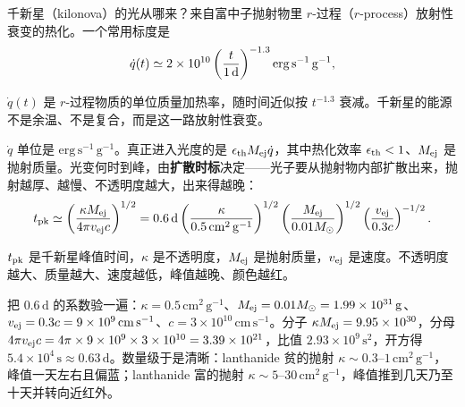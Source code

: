 千新星（kilonova）的光从哪来？来自富中子抛射物里 \(r\)-过程（\(r\)-process）放射性衰变的热化。一个常用标度是
\begin{equation}
  \dot q(t)\simeq
  2\times10^{10}
  \left(\frac{t}{1\,{\rm d}}\right)^{-1.3}
  {\rm erg\,s^{-1}\,g^{-1}},
  \label{eq:e20-rprocess-heating}
\end{equation}
\begin{formulaexplain}
\(\dot q(t)\) 是 \(r\)-过程物质的单位质量加热率，随时间近似按 \(t^{-1.3}\) 衰减。千新星的能源不是余温、不是复合，而是这一路放射性衰变。
\end{formulaexplain}
\(\dot q\) 单位是 \(\mathrm{erg\,s^{-1}\,g^{-1}}\)。真正进入光度的是 \(\epsilon_{\rm th}M_{\rm ej}\dot q\)，其中热化效率 \(\epsilon_{\rm th}<1\)、\(M_{\rm ej}\) 是抛射质量。光变何时到峰，由\textbf{扩散时标}决定——光子要从抛射物内部扩散出来，抛射越厚、越慢、不透明度越大，出来得越晚：
\begin{equation}
  t_{\rm pk}\simeq
  \left(\frac{\kappa M_{\rm ej}}{4\pi v_{\rm ej}c}\right)^{1/2}
  =
  0.6\,{\rm d}
  \left(\frac{\kappa}{0.5\,{\rm cm^2\,g^{-1}}}\right)^{1/2}
  \left(\frac{M_{\rm ej}}{0.01M_\odot}\right)^{1/2}
  \left(\frac{v_{\rm ej}}{0.3c}\right)^{-1/2}.
  \label{eq:e20-kilonova-diffusion}
\end{equation}
\begin{formulaexplain}
\(t_{\rm pk}\) 是千新星峰值时间，\(\kappa\) 是不透明度，\(M_{\rm ej}\) 是抛射质量，\(v_{\rm ej}\) 是速度。不透明度越大、质量越大、速度越低，峰值越晚、颜色越红。
\end{formulaexplain}
把 \(0.6\,\mathrm{d}\) 的系数验一遍：\(\kappa=0.5\,\mathrm{cm^2\,g^{-1}}\)、\(M_{\rm ej}=0.01M_\odot=1.99\times10^{31}\,\mathrm{g}\)、\(v_{\rm ej}=0.3c=9\times10^9\,\mathrm{cm\,s^{-1}}\)、\(c=3\times10^{10}\,\mathrm{cm\,s^{-1}}\)。分子 \(\kappa M_{\rm ej}=9.95\times10^{30}\)，分母 \(4\pi v_{\rm ej}c=4\pi\times9\times10^9\times3\times10^{10}=3.39\times10^{21}\)，比值 \(2.93\times10^{9}\,\mathrm{s^2}\)，开方得 \(5.4\times10^4\,\mathrm{s}\approx0.63\,\mathrm{d}\)。数量级于是清晰：lanthanide 贫的抛射 \(\kappa\sim0.3\text{--}1\,\mathrm{cm^2\,g^{-1}}\)，峰值一天左右且偏蓝；lanthanide 富的抛射 \(\kappa\sim5\text{--}30\,\mathrm{cm^2\,g^{-1}}\)，峰值推到几天乃至十天并转向近红外。


